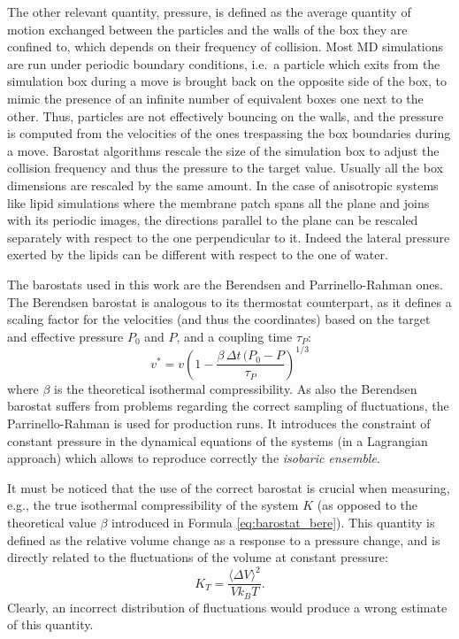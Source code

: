 The other relevant quantity, pressure, is defined as the average quantity of motion exchanged between the particles and the walls of the box they are confined to, which depends on their frequency of collision. Most MD simulations are run under periodic boundary conditions, i.e.\ a particle which exits from the simulation box during a move is brought back on the opposite side of the box, to mimic the presence of an infinite number of equivalent boxes one next to the other.
%
Thus, particles are not effectively bouncing on the walls, and the pressure is computed from the velocities of the ones trespassing the box boundaries during a move.
%
Barostat algorithms rescale the size of the simulation box to adjust the collision frequency and thus the pressure to the target value. Usually all the box dimensions are rescaled by the same amount. In the case of anisotropic systems like lipid simulations where the membrane patch spans all the plane and joins with its periodic images, the directions parallel to the plane can be rescaled separately with respect to the one perpendicular to it. Indeed the lateral pressure exerted by the lipids can be different with respect to the one of water.

The barostats used in this work are the Berendsen \citep{Berendsen1984} and Parrinello-Rahman \citep{Parrinello1981} ones. The Berendsen barostat is analogous to its thermostat counterpart, as it defines a scaling factor for the velocities (and thus the coordinates) based on the target and effective pressure $P_0$ and $P$, and a coupling time $\tau_P$:
\begin{equation} \label{eq:barostat_bere}
    v^* = v \left( 1 - \frac{\beta \, \Delta t \, (P_0 - P}{\tau_P} \right)^{1/3}
\end{equation}
where $\beta$ is the theoretical isothermal compressibility. As also the Berendsen barostat suffers from problems regarding the correct sampling of fluctuations, the Parrinello-Rahman is used for production runs. It introduces the constraint of constant pressure in the dynamical equations of the systems (in a Lagrangian approach) which allows to reproduce correctly the \emph{isobaric ensemble}.

It must be noticed that the use of the correct barostat is crucial when measuring, e.g., the true isothermal compressibility of the system $K$ (as opposed to the theoretical value $\beta$ introduced in Formula \ref{eq:barostat_bere}). This quantity is defined as the relative volume change as a response to a pressure change, and is directly related to the fluctuations of the volume at constant pressure:
\begin{equation}
K_T = \frac{\langle \Delta V \rangle ^2}{Vk_BT}.
\end{equation}
Clearly, an incorrect distribution of fluctuations would produce a wrong estimate of this quantity.

